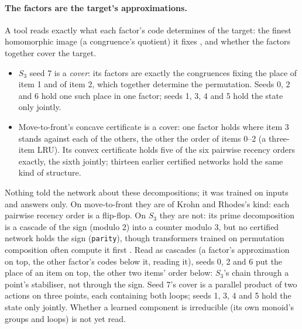 \documentclass[11pt]{article}
\begin{document}
\paragraph{The factors are the target's approximations.} A tool reads exactly what each factor's
code determines of the target: the finest homomorphic image (a congruence's quotient) it fixes
\citep{egri-nagy-2015-computational-holonomy-decomposition}, and whether the factors together cover
the target.
\begin{itemize}
  \item $S_3$ seed 7 is a \emph{cover}: its factors are exactly the congruences fixing the place of
  item 1 and of item 2, which together determine the permutation. Seeds 0, 2 and 6 hold one such
  place in one factor; seeds 1, 3, 4 and 5 hold the state only jointly.
  \item Move-to-front's concave certificate is a cover: one factor holds where item 3 stands against
  each of the others, the other the order of items 0--2 (a three-item LRU). Its convex certificate
  holds five of the six pairwise recency orders exactly, the sixth jointly; thirteen earlier
  certified networks hold the same kind of structure.
\end{itemize}
Nothing told the network about these decompositions; it was trained on inputs and answers only. On
move-to-front they are of Krohn and Rhodes's kind: each pairwise recency order is a flip-flop. On
$S_3$ they are not: its prime decomposition is a cascade of the sign (modulo 2) into a counter
modulo 3, but no certified network holds the sign (\texttt{parity}), though transformers trained on
permutation composition often compute it first \citep{li-2025-how-language-models-track-state}. Read as cascades (a factor's
approximation on top, the other factor's codes below it, reading it), seeds 0, 2 and 6 put the place
of an item on top, the other two items' order below: $S_3$'s chain through a point's stabiliser, not
through the sign. Seed 7's cover is a parallel product of two actions on three points, each containing
both loops; seeds 1, 3, 4 and 5 hold the state only jointly. Whether a learned component is
irreducible (its own monoid's groups and loops) is not yet read.
\end{document}
